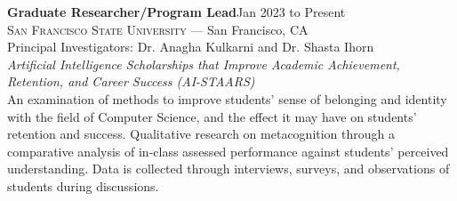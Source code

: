 \documentclass[hidelinks, 10pt]{article}
\def\contentwidth{0.9\linewidth}    %
\def\contentblockspacing{2.5mm}     %
\def\contentheaderspacing{1mm}      %
\begin{document}
{\vspace{\contentblockspacing}

\begin{minipage}[ct]{\contentwidth}
    \textbf{Graduate Researcher/Program Lead}\hfill Jan 2023 to Present\\
    \textsc{San Francisco State University} --- San Francisco, CA\\
    Principal Investigators: Dr. Anagha Kulkarni and Dr. Shasta Ihorn
    \vspace{\contentheaderspacing}\\
    {\textit{Artificial Intelligence Scholarships that Improve Academic Achievement, Retention, and Career Success (AI-STAARS)}}\\
    An examination of methods to improve students' sense of belonging and identity with the field of Computer Science,
    and the effect it may have on students' retention and success.  Qualitative research on metacognition through a comparative
    analysis of in-class assessed performance against students' perceived understanding.  Data is collected through interviews, surveys,
    and observations of students during discussions.
\end{minipage}

\vspace{\contentblockspacing}

}
\end{document}
